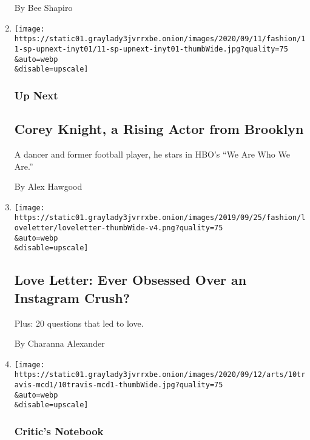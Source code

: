 \begin{enumerate}
  By Bee Shapiro
\item
  \href{/2020/09/11/style/corey-knight-a-rising-actor-from-brooklyn.html}{}

  \texttt{[image: https://static01.graylady3jvrrxbe.onion/images/2020/09/11/fashion/11-sp-upnext-inyt01/11-sp-upnext-inyt01-thumbWide.jpg?quality=75\\\&auto=webp\\\&disable=upscale]}

  \hypertarget{up-next-1}{%
  \subsubsection{Up Next}\label{up-next-1}}

  \hypertarget{corey-knight-a-rising-actor-from-brooklyn-1}{%
  \subsection{Corey Knight, a Rising Actor from
  Brooklyn}\label{corey-knight-a-rising-actor-from-brooklyn-1}}

  A dancer and former football player, he stars in HBO's ``We Are Who We
  Are.''

  By Alex Hawgood
\item
  \href{/2020/09/11/style/love-letter-newsletter-ever-obsessed-over-an-instagram-crush.html}{}

  \texttt{[image: https://static01.graylady3jvrrxbe.onion/images/2019/09/25/fashion/loveletter/loveletter-thumbWide-v4.png?quality=75\\\&auto=webp\\\&disable=upscale]}

  \hypertarget{love-letter-ever-obsessed-over-an-instagram-crush}{%
  \subsection{Love Letter: Ever Obsessed Over an Instagram
  Crush?}\label{love-letter-ever-obsessed-over-an-instagram-crush}}

  Plus: 20 questions that led to love.

  By Charanna Alexander
\item
  \href{/2020/09/11/arts/music/travis-scott-mcdonalds.html}{}

  \texttt{[image: https://static01.graylady3jvrrxbe.onion/images/2020/09/12/arts/10travis-mcd1/10travis-mcd1-thumbWide.jpg?quality=75\\\&auto=webp\\\&disable=upscale]}

  \hypertarget{critics-notebook}{%
  \subsubsection{Critic's Notebook}\label{critics-notebook}}


\end{enumerate}
